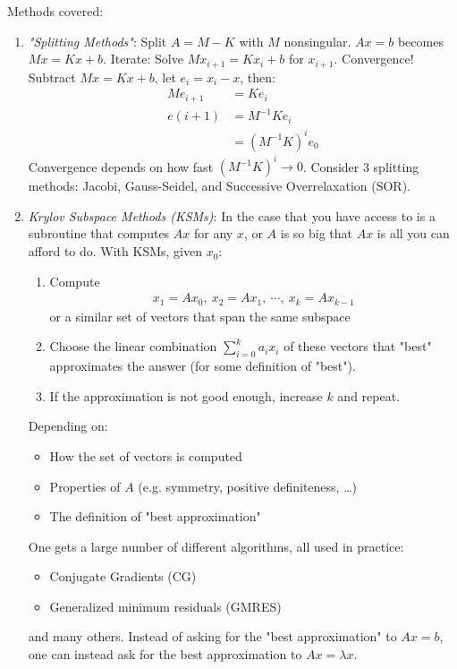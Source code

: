 \documentclass[11pt]{article}
\numberwithin{equation}{section}
\begin{document}
Methods covered:\begin{enumerate}
    \item \textit{"Splitting Methods"}: Split $A=M-K$ with $M$ nonsingular. $Ax=b$ becomes $Mx = Kx+b$. Iterate: Solve $Mx_{i+1}=Kx_i +b$ for $x_{i+1}$. Convergence!
    Subtract $Mx = Kx+b$, let $e_i = x_i - x$, then: \begin{align*}
        Me_{i+1} &= Ke_i \\
        e(i+1) &= M^{-1}Ke_i \\
        &= \left( M^{-1}K \right)^{i} e_0
    \end{align*}
    Convergence depends on how fast $\left( M^{-1}K \right)^i \rightarrow 0$. Consider 3 splitting methods: Jacobi,  Gauss-Seidel, and Successive Overrelaxation (SOR).
    \item  \textit{Krylov Subspace Methods (KSMs)}: In the case that you have access to is a subroutine that computes $Ax$ for any $x$, or $A$ is so big that $Ax$ is all you can afford to do.
    With KSMs, given $x_0$:\begin{enumerate}
        \item Compute \begin{align*}
            x_1 = Ax_0, \ x_2 = Ax_1, \ \cdots, \ x_k = Ax_{k-1}
        \end{align*} or a similar set of vectors that span the same subspace
        \item Choose the linear combination $\sum_{i=0}^k a_i x_i$ of these vectors that "best" approximates the answer (for some definition of "best").
        \item If the approximation is not good enough, increase $k$ and repeat.
    \end{enumerate}
    Depending on: \begin{itemize}
        \item How the set of vectors is computed
        \item Properties of $A$ (e.g. symmetry, positive definiteness, \ldots)
        \item The definition of "best approximation"
    \end{itemize}
    One gets a large number of different algorithms, all used in practice:\begin{itemize}
        \item Conjugate Gradients (CG)
        \item Generalized minimum residuals (GMRES)
    \end{itemize}
    and many others. Instead of asking for the "best approximation" to $Ax=b$, one can instead ask for the best approximation to $Ax=\lambda x$.

\end{enumerate}
\end{document}
